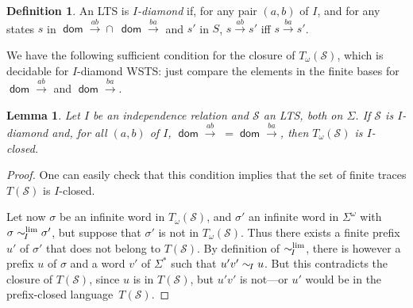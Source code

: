 \documentclass[11pt,reqno,a4paper]{amsart}
\newcommand{\ru}[1]{\xrightarrow{#1}}
\newcommand{\dom}{\mathop{\mathsf{dom}}}
\theoremstyle{plain}
\newtheorem{lemma}[theorem]{Lemma}
\theoremstyle{definition}
\newtheorem{definition}[theorem]{Definition}
\theoremstyle{remark}
\begin{document}
\begin{definition}
  An LTS is \emph{$I$-diamond} if, for any pair $(a,b)$
  of $I$, and for any states $s$ in $\dom\ru{ab}\cap\:\dom\ru{ba}$ and
  $s'$ in $S$, $s\ru{ab}s'$ iff $s\ru{ba}s'$.
\end{definition}
\noindent We have the following sufficient condition for the closure of
$T_\omega(\mathcal{S})$, which is decidable for $I$-diamond WSTS: just
compare the elements in the finite bases for $\dom\ru{ab}$ and
$\dom\ru{ba}$.
\begin{lemma}\label{lemwstscl}Let $I$ be an independence relation and $\mathcal{S}$ an
  LTS, both on $\Sigma$.  If $\mathcal{S}$ is $I$-diamond and, for
  all $(a,b)$ of $I$, $\dom\ru{ab}\;=\dom\ru{ba}$, then
  $T_\omega(\mathcal{S})$ is $I$-closed.
\end{lemma}\begin{proof}
  One can easily check that this condition implies that the set of
  finite traces $T(\mathcal{S})$ is $I$-closed.

  Let now $\sigma$ be an infinite word in $T_\omega(\mathcal{S})$, and
  $\sigma'$ an infinite word in $\Sigma^\omega$ with
  $\sigma\mathrel{\sim_{\!I}^\mathrm{lim}}\sigma'$, but suppose that $\sigma'$ is not in
  $T_\omega(\mathcal{S})$.  Thus there exists a finite prefix $u'$ of
  $\sigma'$ that does not belong to $T(\mathcal{S})$.  By definition of
  $\mathrel{\sim_{\!I}^\mathrm{lim}}$, there is however a prefix $u$ of $\sigma$ and a word $v'$ of
  $\Sigma^\ast$ such that $u'v'\mathrel{\sim_{\!I}} u$.  But this contradicts the closure
  of $T(\mathcal{S})$, since $u$ is in $T(\mathcal{S})$, but $u'v'$ is
  not---or $u'$ would be in the prefix-closed language~$T(\mathcal{S})$.
\end{proof}
\end{document}
